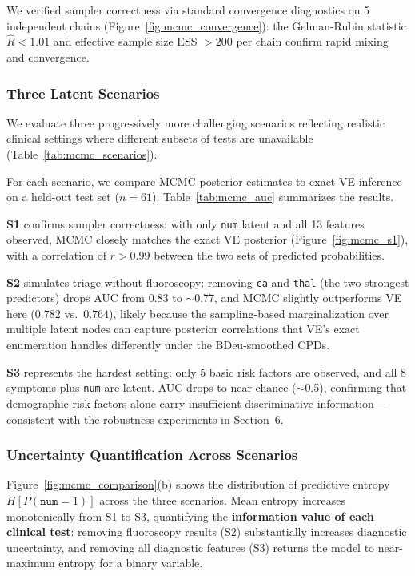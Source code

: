 \documentclass{article}
\begin{document}
We verified sampler correctness via standard convergence diagnostics on 5 independent chains (Figure~\ref{fig:mcmc_convergence}): the Gelman-Rubin statistic $\hat{R} < 1.01$ and effective sample size ESS $> 200$ per chain confirm rapid mixing and convergence.

\subsubsection{Three Latent Scenarios}

We evaluate three progressively more challenging scenarios reflecting realistic clinical settings where different subsets of tests are unavailable (Table~\ref{tab:mcmc_scenarios}).

For each scenario, we compare MCMC posterior estimates to exact VE inference on a held-out test set ($n\!=\!61$). Table~\ref{tab:mcmc_auc} summarizes the results.

\textbf{S1} confirms sampler correctness: with only \texttt{num} latent and all 13 features observed, MCMC closely matches the exact VE posterior (Figure~\ref{fig:mcmc_s1}), with a correlation of $r > 0.99$ between the two sets of predicted probabilities.

\textbf{S2} simulates triage without fluoroscopy: removing \texttt{ca} and \texttt{thal} (the two strongest predictors) drops AUC from 0.83 to $\sim$0.77, and MCMC slightly outperforms VE here ($0.782$ vs.\ $0.764$), likely because the sampling-based marginalization over multiple latent nodes can capture posterior correlations that VE's exact enumeration handles differently under the BDeu-smoothed CPDs.

\textbf{S3} represents the hardest setting: only 5 basic risk factors are observed, and all 8 symptoms plus \texttt{num} are latent. AUC drops to near-chance ($\sim$0.5), confirming that demographic risk factors alone carry insufficient discriminative information---consistent with the robustness experiments in Section~6.

\subsubsection{Uncertainty Quantification Across Scenarios}

Figure~\ref{fig:mcmc_comparison}(b) shows the distribution of predictive entropy $H[P(\texttt{num}\!=\!1)]$ across the three scenarios. Mean entropy increases monotonically from S1 to S3, quantifying the \textbf{information value of each clinical test}: removing fluoroscopy results (S2) substantially increases diagnostic uncertainty, and removing all diagnostic features (S3) returns the model to near-maximum entropy for a binary variable.
\end{document}
